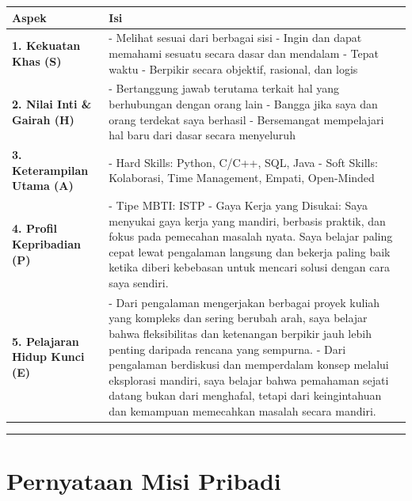 \documentclass[
  letterpaper,
  DIV=11,
  numbers=noendperiod]{scrreprt}
\begin{document}
\begin{longtable}[]{@{}
  >{\raggedright\arraybackslash}p{}
  >{\raggedright\arraybackslash}p{}@{}}
\toprule\noalign{}
\begin{minipage}[b]{\linewidth}\raggedright
Aspek
\end{minipage} & \begin{minipage}[b]{\linewidth}\raggedright
Isi
\end{minipage} \\
\midrule\noalign{}
\endhead
\bottomrule\noalign{}
\endlastfoot
\textbf{1. Kekuatan Khas (S)} & - Melihat sesuai dari berbagai sisi -
Ingin dan dapat memahami sesuatu secara dasar dan mendalam - Tepat waktu
- Berpikir secara objektif, rasional, dan logis \\
\textbf{2. Nilai Inti \& Gairah (H)} & - Bertanggung jawab terutama
terkait hal yang berhubungan dengan orang lain - Bangga jika saya dan
orang terdekat saya berhasil - Bersemangat mempelajari hal baru dari
dasar secara menyeluruh \\
\textbf{3. Keterampilan Utama (A)} & - Hard Skills: Python, C/C++, SQL,
Java - Soft Skills: Kolaborasi, Time Management, Empati, Open-Minded \\
\textbf{4. Profil Kepribadian (P)} & - Tipe MBTI: ISTP - Gaya Kerja yang
Disukai: Saya menyukai gaya kerja yang mandiri, berbasis praktik, dan
fokus pada pemecahan masalah nyata. Saya belajar paling cepat lewat
pengalaman langsung dan bekerja paling baik ketika diberi kebebasan
untuk mencari solusi dengan cara saya sendiri. \\
\textbf{5. Pelajaran Hidup Kunci (E)} & - Dari pengalaman mengerjakan
berbagai proyek kuliah yang kompleks dan sering berubah arah, saya
belajar bahwa fleksibilitas dan ketenangan berpikir jauh lebih penting
daripada rencana yang sempurna. - Dari pengalaman berdiskusi dan
memperdalam konsep melalui eksplorasi mandiri, saya belajar bahwa
pemahaman sejati datang bukan dari menghafal, tetapi dari keingintahuan
dan kemampuan memecahkan masalah secara mandiri. \\
\end{longtable}

\begin{center}\rule{0.5\linewidth}{0.5pt}\end{center}

\section{Pernyataan Misi Pribadi}\label{pernyataan-misi-pribadi}
\end{document}
